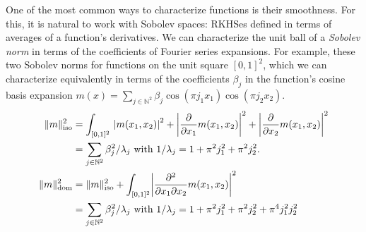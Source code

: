\documentclass{article}
\DeclarePairedDelimiter\norm{\lVert}{\rVert}
\DeclarePairedDelimiter\abs{\lvert}{\rvert}
\theoremstyle{definition}
\newcommand{\<}{\langle}
\renewcommand{\>}{\rangle}
\newcommand\cmnt[2]{\;
{\textcolor{red}{[{\em #1 --- #2}] \;}
}}
\newcommand\avi[1]{\cmnt{#1}{Avi}}
\newcommand\dah[1]{\cmnt{#1}{Skip}}
\begin{document}
One of the most common ways to characterize functions is their smoothness. For this, it is natural to work with Sobolev spaces: RKHSes defined in terms of averages of a function's derivatives. We can characterize the unit ball of a \emph{Sobolev norm} in terms of the coefficients of Fourier series expansions. For example, these two Sobolev norms for functions on the unit square $[0,1]^2$, which we can characterize equivalently in terms of the coefficients $\beta_j$ in the function's cosine basis expansion $m(x) = \sum_{j \in \mathbb{N}^2} \beta_j \cos(\pi j_1x_1)\cos(\pi j_2x_2)$.
\begin{align}
\norm{m}_{\text{iso}}^2
&=  \int_{[0,1]^2} \ \abs*{m(x_1,x_2)}^2 + \abs*{\frac{\partial }{\partial x_1}m(x_1,x_2)}^2 +
     \abs*{\frac{\partial }{\partial x_2}m(x_1,x_2)}^2  \label{eq:sobolev-derivative} \\
&= \sum_{j \in \mathbb{N}^2} \beta_j^2/\lambda_j \text{ with } 1/\lambda_j = 1+\pi^2j_1^2 + \pi^2j_2^2 \label{eq:sobolev-fourier}. \\
\norm{m}_{\text{dom}}^2
&=  \norm{m}_{\text{iso}}^2 + \int_{[0,1]^2} \abs*{\frac{\partial^2 }{\partial x_1 \partial x_2}m(x_1,x_2)}^2 \label{eq:ms-sobolev-derivative} \\
&= \sum_{j \in \mathbb{N}^2} \beta_j^2/\lambda_j \text{ with } 1/\lambda_j = 1+\pi^2j_1^2 + \pi^2j_2^2 + \pi^4j_1^2j_2^2 \label{eq:ms-sobolev-fourier}
\end{align}
\end{document}
